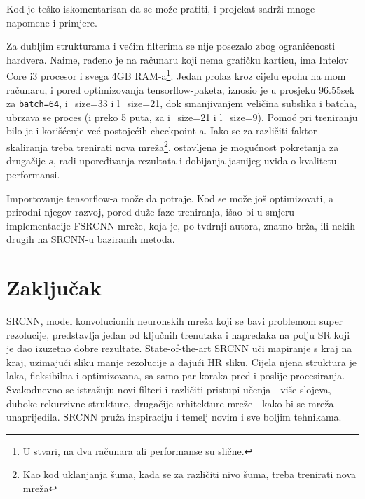 \documentclass[12pt]{report}
\numberwithin{equation}{section}
\begin{document}
   Kod je teško iskomentarisan da se može pratiti, i projekat sadrži mnoge napomene i primjere.
  
   Za dubljim strukturama i većim filterima se nije posezalo zbog ograničenosti hardvera. Naime, rađeno je na računaru koji nema grafičku karticu, ima Intelov Core i3 procesor i svega 4GB RAM-a\footnote{U stvari, na dva računara ali performanse su slične.}. Jedan prolaz kroz cijelu epohu na mom računaru, i pored optimizovanja tensorflow-paketa, iznosio je u prosjeku 96.55sek za \texttt{batch=64}, i\_size=33 i l\_size=21, dok smanjivanjem veličina subslika i batcha, ubrzava se proces (i preko 5 puta, za i\_size=21 i l\_size=9). Pomoć pri treniranju bilo je i korišćenje već postojećih checkpoint-a. Iako se za različiti faktor skaliranja treba trenirati nova mreža\footnote{Kao kod uklanjanja šuma, kada se za različiti nivo šuma, treba trenirati nova mreža}, ostavljena je mogućnost pokretanja za drugačije $s$, radi upoređivanja rezultata i dobijanja jasnijeg uvida o kvalitetu performansi. 
  
 Importovanje tensorflow-a može da potraje. Kod se može još optimizovati, a prirodni njegov razvoj, pored duže faze treniranja, išao bi u smjeru implementacije FSRCNN mreže, koja je, po tvdrnji autora, znatno brža, ili nekih drugih na SRCNN-u baziranih metoda. 

  
  
 
    


\chapter{Zaključak}\label{ch2}  
  
  SRCNN, model konvolucionih neuronskih mreža koji se bavi problemom super rezolucije, predstavlja jedan od ključnih trenutaka i napredaka na polju SR koji je dao izuzetno dobre rezultate. State-of-the-art SRCNN uči mapiranje s kraj na kraj, uzimajući sliku manje rezolucije a dajući HR sliku. Cijela njena struktura je laka, fleksibilna i optimizovana, sa samo par koraka pred i poslije procesiranja. Svakodnevno se istražuju novi filteri i različiti pristupi učenja - više slojeva, duboke rekurzivne strukture, drugačije arhitekture mreže - kako bi se mreža unaprijedila. SRCNN pruža inspiraciju i temelj novim i sve boljim tehnikama.
 
\end{document}
